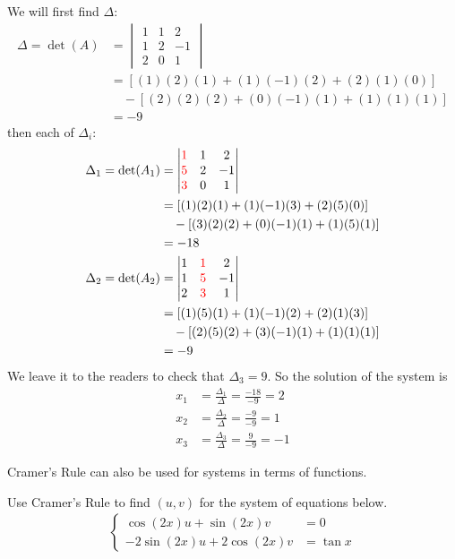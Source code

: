\begin{solution}
We will first find $\Delta$:
\begin{align*}
\Delta = \det(A) &=
\begin{vmatrix}
1 & 1 & 2 \\
1 & 2 & -1 \\
2 & 0 & 1   
\end{vmatrix} \\
&= [(1)(2)(1) + (1)(-1)(2) + (2)(1)(0)] \\
&\quad - [(2)(2)(2) + (0)(-1)(1) + (1)(1)(1)] \\
&= -9
\end{align*}
then each of $\Delta_i$:
\begin{align*}
\Delta_1 = \det(A_1) &=
\begin{vmatrix}
\mathcolor{red}{1} & 1 & 2 \\
\mathcolor{red}{5} & 2 & -1 \\
\mathcolor{red}{3} & 0 & 1    
\end{vmatrix} \\
&= [(1)(2)(1) + (1)(-1)(3) + (2)(5)(0)] \\
&\quad - [(3)(2)(2) + (0)(-1)(1) + (1)(5)(1)] \\
&= -18 \\
\Delta_2 = \det(A_2) &=
\begin{vmatrix}
1 & \mathcolor{red}{1} & 2 \\
1 & \mathcolor{red}{5} & -1 \\
2 & \mathcolor{red}{3} & 1   
\end{vmatrix} \\
&= [(1)(5)(1) + (1)(-1)(2) + (2)(1)(3)] \\
&\quad - [(2)(5)(2) + (3)(-1)(1) + (1)(1)(1)] \\
&= -9
\end{align*}
We leave it to the readers to check that $\Delta_3 = 9$. So the solution of the system is
\begin{align*}
x_1 &= \frac{\Delta_1}{\Delta} = \frac{-18}{-9} = 2 \\
x_2 &= \frac{\Delta_2}{\Delta} = \frac{-9}{-9} = 1 \\
x_3 &= \frac{\Delta_3}{\Delta} = \frac{9}{-9} = -1 
\end{align*}
\end{solution}
Cramer's Rule can also be used for systems in terms of functions.
\begin{exmp}
Use Cramer's Rule to find $(u,v)$ for the system of equations below.
\begin{align}
\left\{\begin{alignedat}{1}
\cos(2x)u + \sin(2x)v &= 0 \\
-2\sin(2x)u + 2\cos(2x)v &= \tan x 
\end{alignedat}\right.
\end{align}
\end{exmp}
